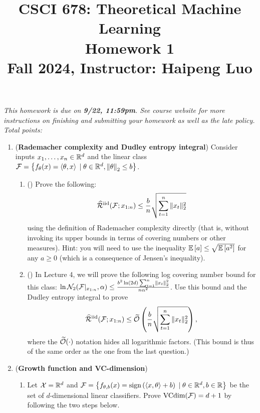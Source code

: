 \documentclass{article}
\title{CSCI 678: Theoretical Machine Learning \\ Homework 1 \\ {\small Fall 2024, Instructor: Haipeng Luo}}
\begin{document}
\maketitle
\textit{This homework is due on {\bf 9/22, 11:59pm}. 
See course website for more instructions on finishing and submitting your homework as well as the late policy. Total points: }\\


\begin{enumerate}[leftmargin=*,align=left]
\item
({\bf Rademacher complexity and Dudley entropy integral}) 
Consider inputs $x_1, \ldots, x_n \in \mathbb{R}^d$ and the linear class ${\mathcal{F}} = \left\{f_\theta(x) = \left\langle \theta,x \right\rangle \;|\; \theta \in \mathbb{R}^d, \left\|{\theta}\right\|_2 \leq b\right\}$.

\begin{enumerate}[leftmargin=*,align=left]
\item ()
Prove the following:
\[
\widehat{{\mathcal{R}}}^{{\text{\rm iid}}}({\mathcal{F}}; x_{1:n})  \leq \frac{b}{n}\sqrt{\sum_{t=1}^n \|x_t\|_2^2}
\]
using the definition of Rademacher complexity directly (that is, without invoking its upper bounds in terms of covering numbers or other measures).
Hint: you will need to use the inequality $\mathbb{E}\left[a\right] \leq \sqrt{\mathbb{E}\left[a^2\right]}$ for any $a\geq 0$ (which is a consequence of Jensen's inequality). \\



\newpage
\item () 
In Lecture 4, we will prove the following log covering number bound for this class: $\ln {\mathcal{N}}_2({\mathcal{F}}|_{x_{1:n}}, \alpha) \leq \frac{b^2\ln (2d)\sum_{t=1}^n \left\|{x_t}\right\|_2^2}{n\alpha^2}$.
Use this bound and the Dudley entropy integral to prove
\[
\widehat{{\mathcal{R}}}^{{\text{\rm iid}}}({\mathcal{F}}; x_{1:n})  \leq \widetilde{\mathcal{O}}\left(\frac{b}{n}\sqrt{\sum_{t=1}^n \|x_t\|_2^2}\right),
\]
where the $\widetilde{\mathcal{O}}(\cdot)$ notation hides all logarithmic factors.
(This bound is thus of the same order as the one from the last question.)


\end{enumerate}

\newpage
\item
({\bf Growth function and VC-dimension})
\begin{enumerate}[leftmargin=*,align=left]
\vspace{5pt}
\item 
Let ${\mathcal{X}} = \mathbb{R}^d$ and ${\mathcal{F}} = \left\{f_{\theta,b}(x) =  {\text{\rm sign}}\left(\left\langle x,\theta \right\rangle+b\right) \;|\; \theta \in \mathbb{R}^d, b \in \mathbb{R}\right\}$ be the set of $d$-dimensional linear classifiers.
Prove ${\text{\rm VCdim}}({\mathcal{F}}) = d+1$ by following the two steps below.


\end{enumerate}
\end{enumerate}
\end{document}
